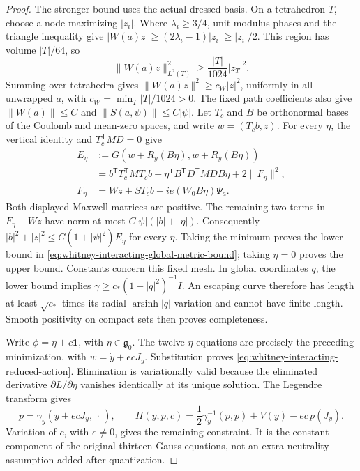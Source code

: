 \begin{proof}
The stronger bound uses the actual dressed basis. On a tetrahedron \(T\),
choose a node maximizing \(|z_i|\). Where \(\lambda_i\geq3/4\),
unit-modulus phases and the triangle inequality give
\(|W(a)z|\geq(2\lambda_i-1)|z_i|\geq|z_i|/2\).
This region has volume \(|T|/64\), so
\[
 \|W(a)z\|_{L^2(T)}^2\geq\frac{|T|}{1024}|z_T|^2.
\]
Summing over tetrahedra gives \(\|W(a)z\|^2\geq c_W|z|^2\),
uniformly in all unwrapped \(a\), with
\(c_W=\min_T|T|/1024>0\). The fixed path coefficients also give
\(\|W(a)\|\leq C\) and \(\|S(a,\psi)\|\leq C|\psi|\).
Let \(T_c\) and \(B\) be orthonormal bases of the Coulomb and mean-zero
spaces, and write \(w=(T_cb,z)\). For every \(\eta\), the vertical
identity and \(T_c^{\mathsf T}MD=0\) give
\begin{align*}
 E_\eta&:=G(w+R_y(B\eta),w+R_y(B\eta))\\
 &=b^{\mathsf T}T_c^{\mathsf T}MT_cb+
   \eta^{\mathsf T}B^{\mathsf T}D^{\mathsf T}MDB\eta+2\|F_\eta\|^2,\\
 F_\eta&=Wz+ST_cb+ie(W_0B\eta)\Psi_a.
\end{align*}
Both displayed Maxwell matrices are positive. The remaining two terms in
\(F_\eta-Wz\) have norm at most
\(C|\psi|(|b|+|\eta|)\). Consequently
\(|b|^2+|z|^2\leq C(1+|\psi|^2)E_\eta\) for every \(\eta\).
Taking the minimum proves the lower bound in
\eqref{eq:whitney-interacting-global-metric-bound}; taking \(\eta=0\)
proves the upper bound. Constants concern this fixed mesh.
In global coordinates \(q\), the lower bound implies
\(\gamma\geq c_*(1+|q|^2)^{-1}I\). An escaping curve therefore has
length at least \(\sqrt{c_*}\) times its radial \(\operatorname{arsinh}|q|\)
variation and cannot have finite length. Smooth positivity on compact sets
then proves completeness.

Write \(\phi=\eta+c\mathbf1\), with \(\eta\in\mathfrak g_0\).
The twelve \(\eta\) equations are precisely the preceding minimization,
with \(w=\dot y+ecJ_y\). Substitution proves
\eqref{eq:whitney-interacting-reduced-action}. Elimination is variationally
valid because the eliminated derivative \(\partial L/\partial\eta\)
vanishes identically at its unique solution. The Legendre transform gives
\[
 p=\gamma_y(\dot y+ecJ_y,\,\cdot\,),\qquad
 H(y,p,c)=\frac12\gamma_y^{-1}(p,p)+V(y)-ec\,p(J_y).
\]
Variation of \(c\), with \(e\ne0\), gives the remaining constraint.
It is the constant component of the original thirteen Gauss equations,
not an extra neutrality assumption added after quantization.


\end{proof}

